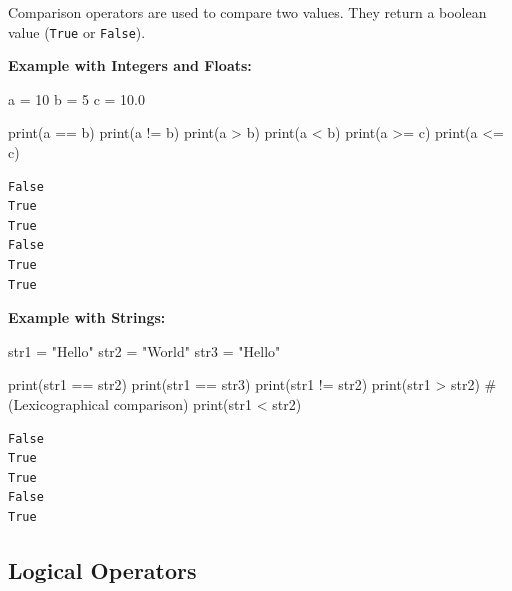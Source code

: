 \documentclass[
  letterpaper,
  DIV=11,
  numbers=noendperiod]{scrreprt}
\newenvironment{Shaded}{\begin{snugshade}}{\end{snugshade}}
\newcommand{\BuiltInTok}[1]{\textcolor[rgb]{0.00,0.23,0.31}{#1}}
\newcommand{\CommentTok}[1]{\textcolor[rgb]{0.37,0.37,0.37}{#1}}
\newcommand{\DecValTok}[1]{\textcolor[rgb]{0.68,0.00,0.00}{#1}}
\newcommand{\FloatTok}[1]{\textcolor[rgb]{0.68,0.00,0.00}{#1}}
\newcommand{\NormalTok}[1]{\textcolor[rgb]{0.00,0.23,0.31}{#1}}
\newcommand{\OperatorTok}[1]{\textcolor[rgb]{0.37,0.37,0.37}{#1}}
\newcommand{\StringTok}[1]{\textcolor[rgb]{0.13,0.47,0.30}{#1}}
\begin{document}
Comparison operators are used to compare two values. They return a
boolean value (\texttt{True} or \texttt{False}).

\textbf{Example with Integers and Floats:}

\begin{Shaded}
\begin{Highlighting}[]
\NormalTok{a }\OperatorTok{=} \DecValTok{10}
\NormalTok{b }\OperatorTok{=} \DecValTok{5}
\NormalTok{c }\OperatorTok{=} \FloatTok{10.0}

\BuiltInTok{print}\NormalTok{(a }\OperatorTok{==}\NormalTok{ b)  }
\BuiltInTok{print}\NormalTok{(a }\OperatorTok{!=}\NormalTok{ b)  }
\BuiltInTok{print}\NormalTok{(a }\OperatorTok{\textgreater{}}\NormalTok{ b)   }
\BuiltInTok{print}\NormalTok{(a }\OperatorTok{\textless{}}\NormalTok{ b)   }
\BuiltInTok{print}\NormalTok{(a }\OperatorTok{\textgreater{}=}\NormalTok{ c)  }
\BuiltInTok{print}\NormalTok{(a }\OperatorTok{\textless{}=}\NormalTok{ c) }
\end{Highlighting}
\end{Shaded}

\begin{verbatim}
False
True
True
False
True
True
\end{verbatim}

\textbf{Example with Strings:}

\begin{Shaded}
\begin{Highlighting}[]
\NormalTok{str1 }\OperatorTok{=} \StringTok{"Hello"}
\NormalTok{str2 }\OperatorTok{=} \StringTok{"World"}
\NormalTok{str3 }\OperatorTok{=} \StringTok{"Hello"}

\BuiltInTok{print}\NormalTok{(str1 }\OperatorTok{==}\NormalTok{ str2)  }
\BuiltInTok{print}\NormalTok{(str1 }\OperatorTok{==}\NormalTok{ str3)  }
\BuiltInTok{print}\NormalTok{(str1 }\OperatorTok{!=}\NormalTok{ str2) }
\BuiltInTok{print}\NormalTok{(str1 }\OperatorTok{\textgreater{}}\NormalTok{ str2)   }\CommentTok{\# (Lexicographical comparison)}
\BuiltInTok{print}\NormalTok{(str1 }\OperatorTok{\textless{}}\NormalTok{ str2)  }
\end{Highlighting}
\end{Shaded}

\begin{verbatim}
False
True
True
False
True
\end{verbatim}

\hypertarget{logical-operators}{%
\subsection{Logical Operators}\label{logical-operators}}
\end{document}
